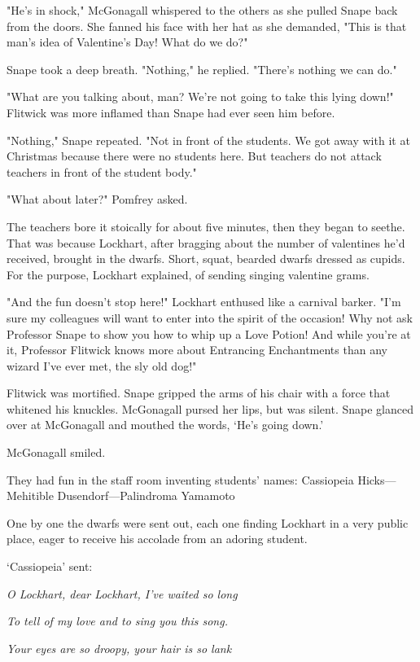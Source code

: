 "He's in shock," McGonagall whispered to the others as she pulled Snape back from the doors. She fanned his face with her hat as she demanded, "This is that man's idea of Valentine's Day! What do we do?"

Snape took a deep breath. "Nothing," he replied. "There's nothing we can do."

"What are you talking about, man? We're not going to take this lying down!" Flitwick was more inflamed than Snape had ever seen him before.

"Nothing," Snape repeated. "Not in front of the students. We got away with it at Christmas because there were no students here. But teachers do not attack teachers in front of the student body."

"What about later?" Pomfrey asked.

The teachers bore it stoically for about five minutes, then they began to seethe. That was because Lockhart, after bragging about the number of valentines he'd received, brought in the dwarfs. Short, squat, bearded dwarfs dressed as cupids. For the purpose, Lockhart explained, of sending singing valentine grams.

"And the fun doesn't stop here!" Lockhart enthused like a carnival barker. "I'm sure my colleagues will want to enter into the spirit of the occasion! Why not ask Professor Snape to show you how to whip up a Love Potion! And while you're at it, Professor Flitwick knows more about Entrancing Enchantments than any wizard I've ever met, the sly old dog!"

Flitwick was mortified. Snape gripped the arms of his chair with a force that whitened his knuckles. McGonagall pursed her lips, but was silent. Snape glanced over at McGonagall and mouthed the words, `He's going down.'

McGonagall smiled.

They had fun in the staff room inventing students' names: Cassiopeia Hicks—Mehitible Dusendorf—Palindroma Yamamoto{\el}

One by one the dwarfs were sent out, each one finding Lockhart in a very public place, eager to receive his accolade from an adoring student.

`Cassiopeia' sent:

\emph{O Lockhart, dear Lockhart, I've waited so long}

\emph{To tell of my love and to sing you this song.}

\emph{Your eyes are so droopy, your hair is so lank}

